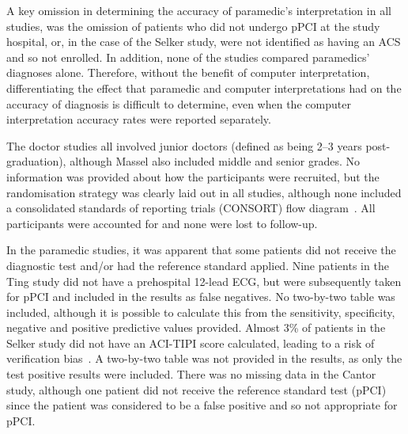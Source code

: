 A key omission in determining the accuracy of paramedic's interpretation in all studies, was the omission of patients who did not undergo pPCI at the study hospital, or, in the case of the Selker study, were not identified as having an ACS and so not enrolled. In addition, none of the studies compared paramedics’ diagnoses alone. Therefore, without the benefit of computer interpretation, differentiating the effect that paramedic and computer interpretations had on the accuracy of diagnosis is difficult to determine, even when the computer interpretation accuracy rates were reported separately.

The doctor studies all involved junior doctors (defined as being 2--3 years post-graduation), although Massel also included middle and senior grades. No information was provided about how the participants were recruited, but the randomisation strategy was clearly laid out in all studies, although none included a consolidated standards of reporting trials (CONSORT) flow diagram~\citep{schulz_consort_2010}. All participants were accounted for and none were lost to follow-up.

In the paramedic studies, it was apparent that some patients did not receive the diagnostic test and\slash or had the reference standard applied. Nine patients in the Ting study did not have a prehospital 12-lead ECG, but were subsequently taken for pPCI and included in the results as false negatives. No two-by-two table was included, although it is possible to calculate this from the sensitivity, specificity, negative and positive predictive values provided. Almost 3\% of patients in the Selker study did not have an ACI-TIPI score calculated, leading to a risk of verification bias~\citep{lijmer_empirical_1999}. A two-by-two table was not provided in the results, as only the test positive results were included. There was no missing data in the Cantor study, although one patient did not receive the reference standard test (pPCI) since the patient was considered to be a false positive and so not appropriate for pPCI.


